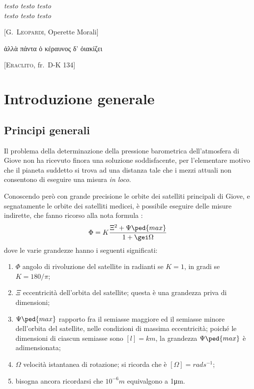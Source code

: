 \documentclass[%
corpo=12pt,
twoside,
tipotesi=magistrale,
]{toptesi}\errorcontextlines=100
\begin{document}
\tablespagetrue\figurespagetrue %
\indici%

\begin{citazioni}
    \textit{testo testo testo\\testo testo testo}

    [\textsc{G.\ Leopardi}, Operette Morali]

    \begin{greek}
    ἀλλὰ πάντα ὁ κέραυνος δ' ὀιακίζει
    \end{greek}

    [\textsc{Eraclito}, fr.\ D-K 134]
\end{citazioni}


\mainmatter %

\chapter{Introduzione generale}

\section{Principi generali}
Il problema della determinazione della pressione barometrica dell'atmosfera di
Giove non ha ricevuto finora una soluzione soddisfacente, per l'elementare
motivo che il pianeta suddetto si trova ad una distanza tale che i mezzi attuali
non consentono di eseguire una misura \emph{in loco}.

Conoscendo però con grande precisione le orbite dei satelliti principali di
Giove, e segnatamente le orbite dei satelliti medicei, è possibile eseguire
delle misure indirette, che fanno ricorso alla nota formula \cite{gal}:
\[
\Phi = K\frac{\Xi^2 +\Psi\ped{max}}{1+\gei\Omega}
\]
dove le varie grandezze hanno i seguenti significati:
\begin{enumerate}
\item
$\Phi$ angolo di rivoluzione del satellite in radianti se $K=1$, in gradi se
$K=180/\pi$;
\item
$\Xi$ eccentricità dell'orbita del satellite; questa è una grandezza priva
di dimensioni;
\item
$\Psi\ped{max}$ rapporto fra il semiasse maggiore ed il semiasse minore
dell'orbita del satellite, nelle condizioni di massima eccentricità;
poiché le dimensioni di ciascun semiasse sono $[l]=\unit{km}$, la grandezza
$\Psi\ped{max}$ è adimensionata;
\item
$\Omega$ velocità istantanea di rotazione; si ricorda che è $[\Omega]=%
\unit{rad}\unit{s}^{-1}$;
\item bisogna ancora ricordarsi che $10^{-6}\unit{m}$ equivalgono a
1\unit{\micro m}.
\end{enumerate}
%
\end{document}
